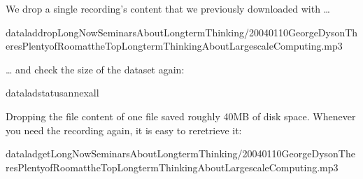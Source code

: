 \sphinxAtStartPar
We drop a single recording’s content that we previously downloaded with
 …

\begin{sphinxVerbatim}[commandchars=\\\{\}]
dataladdropLong\PYGZus{}Now\PYGZus{}\PYGZus{}Seminars\PYGZus{}About\PYGZus{}Long\PYGZus{}term\PYGZus{}Thinking/2004\PYGZus{}01\PYGZus{}10\PYGZus{}\PYGZus{}George\PYGZus{}Dyson\PYGZus{}\PYGZus{}There\PYGZus{}s\PYGZus{}Plenty\PYGZus{}of\PYGZus{}Room\PYGZus{}at\PYGZus{}the\PYGZus{}Top\PYGZus{}\PYGZus{}Long\PYGZus{}term\PYGZus{}Thinking\PYGZus{}About\PYGZus{}Large\PYGZus{}scale\PYGZus{}Computing.mp3
\end{sphinxVerbatim}

\sphinxAtStartPar
… and check the size of the dataset again:

\begin{sphinxVerbatim}[commandchars=\\\{\}]
dataladstatus\PYGZhy{}\PYGZhy{}annexall
\end{sphinxVerbatim}

\sphinxAtStartPar
Dropping the file content of one  file saved roughly 40MB of disk space.
Whenever you need the recording again, it is easy to re\sphinxhyphen{}retrieve it:

\begin{sphinxVerbatim}[commandchars=\\\{\}]
dataladgetLong\PYGZus{}Now\PYGZus{}\PYGZus{}Seminars\PYGZus{}About\PYGZus{}Long\PYGZus{}term\PYGZus{}Thinking/2004\PYGZus{}01\PYGZus{}10\PYGZus{}\PYGZus{}George\PYGZus{}Dyson\PYGZus{}\PYGZus{}There\PYGZus{}s\PYGZus{}Plenty\PYGZus{}of\PYGZus{}Room\PYGZus{}at\PYGZus{}the\PYGZus{}Top\PYGZus{}\PYGZus{}Long\PYGZus{}term\PYGZus{}Thinking\PYGZus{}About\PYGZus{}Large\PYGZus{}scale\PYGZus{}Computing.mp3
\end{sphinxVerbatim}

